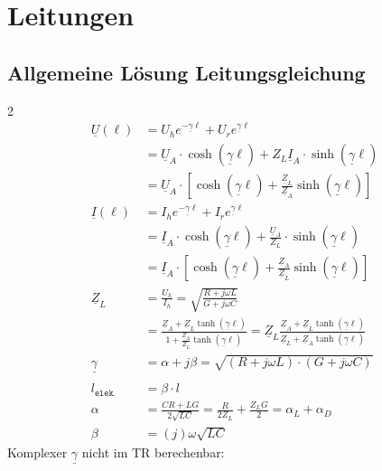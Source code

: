 \section{Leitungen}
\subsection{Allgemeine Lösung Leitungsgleichung}2
\begin{align*}
    \underline{U}(\ell) & = U_h e^{-\underline{\gamma} \ell} + U_r e^{\underline{\gamma} \ell} \\
                        & = \underline{U}_A \cdot \cosh(\underline{\gamma}\ell) + Z_L \underline{I}_A \cdot \sinh(\underline{\gamma}\ell)                                 \\
	                    & = \underline{U}_A \cdot \left[ \cosh(\underline{\gamma} \ell) + \tfrac{\underline{Z}_L}{\underline{Z}_A} \sinh(\underline{\gamma} \ell) \right] \\
    \underline{I}(\ell) & = I_h e^{-\underline{\gamma} \ell} + I_r e^{\underline{\gamma} \ell} \\
                        & = \underline{I}_A \cdot \cosh(\underline{\gamma}\ell) + \frac{\underline{U}_A}{Z_L} \cdot \sinh(\underline{\gamma}\ell)                         \\
	                    & = \underline{I}_A \cdot \left[ \cosh(\underline{\gamma} \ell) + \tfrac{\underline{Z}_A}{\underline{Z}_L} \sinh(\underline{\gamma} \ell) \right] \\
    \underline{Z}_L     & = \frac{U_h}{I_h} = \sqrt{ \frac{R + j \omega L}{G + j \omega C}}                                                                                   \\
                        & = \frac{\underline{Z}_A+ \underline{Z}_L\tanh(\underline{\gamma}
		                    \ell)}{1+\frac{\underline{Z}_A}{\underline{Z}_L}\tanh(\underline{\gamma} \ell)} =
                            \underline{Z}_L \frac{\underline{Z}_A+ \underline{Z}_L\tanh(\underline{\gamma}
                            \ell)}{{\underline{Z}_L}+{\underline{Z}_A}\tanh(\underline{\gamma} \ell)}\\
    \underline{\gamma}  & = \alpha + j\beta = \sqrt{(R+j\omega L)\cdot(G+j\omega C)}     \\                                                                                                       \\
    l_\texttt{elek.}    & = \beta \cdot l                                                                                                                                     \\
    \alpha              & = \frac{C R+L G}{2 \sqrt{L C}}=\frac{R}{2 Z_L}+\frac{Z_L G}{2}=\alpha_L+\alpha_D \\
    \beta               & = (j) \omega \sqrt{L C}
\end{align*}
Komplexer $\underline{\gamma}$ nicht im TR berechenbar:

